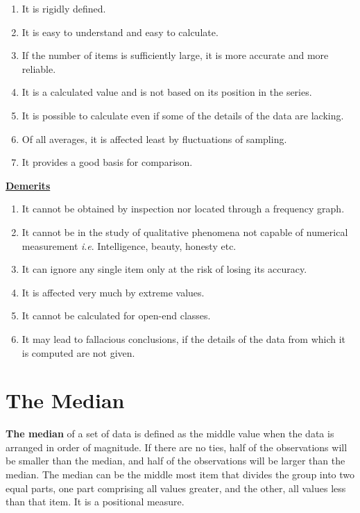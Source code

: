 \documentclass[
]{book}
\begin{document}
\begin{enumerate}
\def\labelenumi{\arabic{enumi}.}
\item
  It is rigidly defined.
\item
  It is easy to understand and easy to calculate.
\item
  If the number of items is sufficiently large, it is more accurate
  and more reliable.
\item
  It is a calculated value and is not based on its position in the
  series.
\item
  It is possible to calculate even if some of the details of the data
  are lacking.
\item
  Of all averages, it is affected least by fluctuations of sampling.
\item
  It provides a good basis for comparison.
\end{enumerate}

\ul{\textbf{Demerits}}

\begin{enumerate}
\def\labelenumi{\arabic{enumi}.}
\item
  It cannot be obtained by inspection nor located through a frequency
  graph.
\item
  It cannot be in the study of qualitative phenomena not capable of
  numerical measurement \emph{i}.\emph{e}. Intelligence, beauty, honesty etc.
\item
  It can ignore any single item only at the risk of losing its
  accuracy.
\item
  It is affected very much by extreme values.
\item
  It cannot be calculated for open-end classes.
\item
  It may lead to fallacious conclusions, if the details of the data
  from which it is computed are not given.
\end{enumerate}

\section{The Median}\label{the-median}

\textbf{The median} of a set of data is defined as the middle value when the
data is arranged in order of magnitude. If there are no ties, half of
the observations will be smaller than the median, and half of the
observations will be larger than the median. The median can be the
middle most item that divides the group into two equal parts, one part
comprising all values greater, and the other, all values less than that
item. It is a positional measure.
\end{document}

